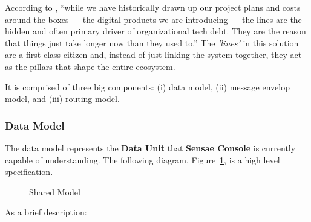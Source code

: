 According to \cite{integration}, ``while we have historically drawn up our project plans and costs around the boxes — the digital products we are introducing — the lines are the hidden and often primary driver of organizational tech debt. They are the reason that things just take longer now than they used to.'' The \textit{'lines'} in this solution are a first class citizen and, instead of just linking the system together, they act as the pillars that shape the entire ecosystem.

It is comprised of three big components: (i) data model, (ii) message envelop model, and (iii) routing model.

\subsubsection{Data Model}
\label{subsubsec:design:domain:shared_model:data}

The data model represents the \textbf{Data Unit} that \textbf{Sensae Console} is currently capable of understanding. The following diagram, Figure~\ref{fig:design:domain:shared_model:data:diagram}, is a high level specification.

\begin{figure}[H]
   \centering
  \resizebox{\columnwidth}{!}
  {
     
  }
  \caption[Shared Model]{Shared Model}
  \label{fig:design:domain:shared_model:data:diagram}
\end{figure}

As a brief description:

